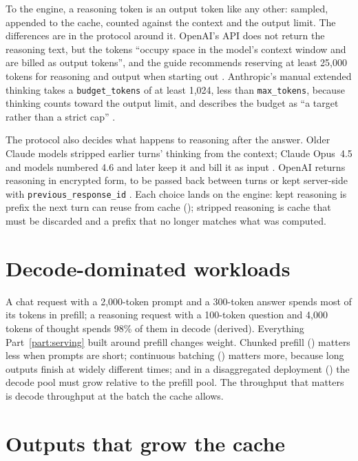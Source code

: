 To the engine, a reasoning token is an output token like any other: sampled,
appended to the cache, counted against the context and the output limit. The
differences are in the protocol around it. OpenAI's API does not return the
reasoning text, but the tokens ``occupy space in the model's context window
and are billed as output tokens'', and the guide recommends reserving at least
25,000 tokens for reasoning and output when starting out
\cite{openai2026reasoning}. Anthropic's manual extended thinking takes a
\texttt{budget\_tokens} of at least 1,024, less than \texttt{max\_tokens},
because thinking counts toward the output limit, and describes the budget as
``a target rather than a strict cap'' \cite{anthropic2026thinking}.

The protocol also decides what happens to reasoning after the answer. Older
Claude models stripped earlier turns' thinking from the context; Claude
Opus~4.5 and models numbered 4.6 and later keep it and bill it as input
\cite{anthropic2026thinking}. OpenAI returns reasoning in encrypted form, to be
passed back between turns or kept server-side with
\texttt{previous\_response\_id} \cite{openai2026reasoning}. Each choice lands on
the engine: kept reasoning is prefix the next turn can reuse from cache
(); stripped reasoning is cache that must be discarded
and a prefix that no longer matches what was computed.

\section{Decode-dominated workloads}

A chat request with a 2,000-token prompt and a 300-token answer spends most of
its tokens in prefill; a reasoning request with a 100-token question and 4,000
tokens of thought spends 98\% of them in decode (derived). Everything Part~\ref{part:serving}
built around prefill changes weight. Chunked prefill ()
matters less when prompts are short; continuous batching
() matters more, because long outputs finish at
widely different times; and in a disaggregated deployment
() the decode pool must grow relative to the
prefill pool. The throughput that matters is decode throughput at the batch
the cache allows.

\section{Outputs that grow the cache}

